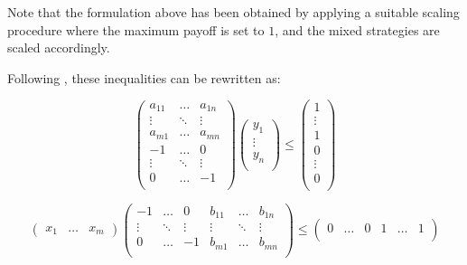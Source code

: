 \documentclass[11pt]{article}
\begin{document}
Note that the formulation above has been obtained by applying a
suitable scaling procedure where the maximum payoff is set to $1$,
and the mixed strategies are scaled accordingly.

Following \cite{vstengel}, these inequalities can be rewritten as:

\begin{equation*}
\begin{pmatrix}

a_{11} & \dots & a_{1n}\\
\vdots & \ddots & \vdots\\
a_{m1} & \dots & a_{mn}\\
-1 & \dots & 0\\
\vdots & \ddots & \vdots\\
0 & \dots & -1\\

\end{pmatrix}
\begin{pmatrix}

y_1\\
\vdots\\
y_n\\

\end{pmatrix}
\le
\begin{pmatrix}

1\\
\vdots\\
1\\
0\\
\vdots\\
0\\

\end{pmatrix}
\end{equation*}

\begin{equation*}
\begin{pmatrix}

x_1 & \dots & x_m

\end{pmatrix}
\begin{pmatrix}

-1 & \dots & 0 & b_{11} & \dots & b_{1n}\\
\vdots & \ddots & \vdots & \vdots & \ddots & \vdots\\
0 & \dots & -1 & b_{m1} & \dots & b_{mn}\\

\end{pmatrix}
\le
\begin{pmatrix}

0 & \dots & 0 & 1 & \dots & 1\\

\end{pmatrix}
\end{equation*}
\end{document}
